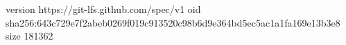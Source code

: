 version https://git-lfs.github.com/spec/v1
oid sha256:643c729e7f2abeb0269f019c913520c98b6d9e364bd5ec5ac1a1fa169e13b3e8
size 181362
